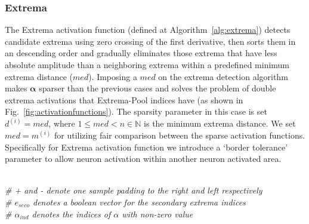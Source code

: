 \documentclass[journal]{IEEEtran}
\begin{document}
\subsubsection{Extrema}\label{sec:extrema}
The Extrema activation function (defined at
Algorithm~\ref{alg:extrema}) detects candidate extrema using zero
crossing of the first derivative, then sorts them in an descending
order and gradually eliminates those extrema that have less absolute
amplitude than a neighboring extrema within a predefined minimum
extrema distance ($med$).
Imposing a $med$ on the extrema detection algorithm makes
$\bm{\alpha}$ sparser than the previous cases and solves the problem
of double extrema activations that Extrema-Pool indices have (as
shown in Fig.~\ref{fig:activationfunctions}).
The sparsity parameter in this case is set $d^{(i)} = med$, where $1
\le med < n \in \mathbb{N}$ is the minimum extrema distance.
We set $med = m^{(i)}$ for utilizing fair comparison between the
sparse activation functions.
Specifically for Extrema activation function we introduce a `border
tolerance' parameter to allow neuron activation within another neuron
activated area.
\begin{algorithm}[H]
  \caption{Extrema detection with minimum extrema distance
  $med$}\label{alg:extrema}
  \begin{algorithmic}[1]
    \renewcommand{\algorithmicrequire}{\textbf{Input:}}
    \renewcommand{\algorithmicensure}{\textbf{Output:}}
    \ENSURE{$\alpha$}
    \\\textit{\scriptsize \# + and - denote one sample padding to the
    right and left respectively}
    \\\textit{\scriptsize \# $e_{seco}$ denotes a boolean vector for
    the secondary extrema indices}
    \ENDIF{}
    \ENDFOR{}
    \\\textit{\scriptsize \# $\alpha_{ind}$ denotes the indices of
    $\alpha$ with non-zero value}
    \ENDFOR{}
    \RETURN{$\alpha$}
  \end{algorithmic}
\end{algorithm}
\end{document}
